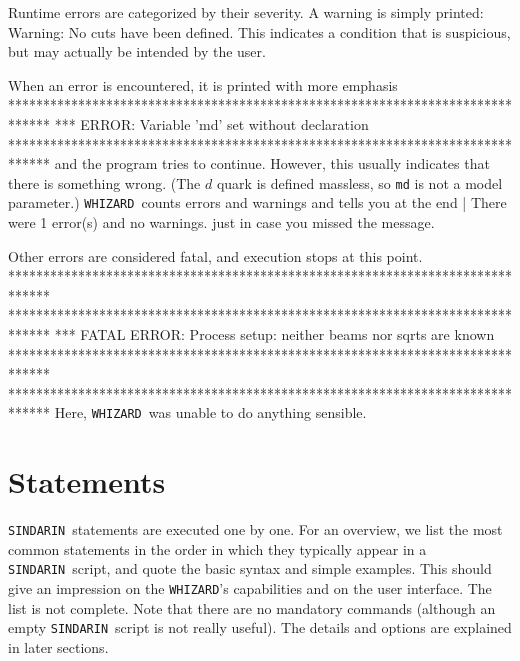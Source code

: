 \documentclass[12pt]{book}
\newenvironment{interaction}%
  {\begingroup\small
   \verbatim}%
  {\endverbatim
   \endgroup\noindent}
\newcommand{\whizard}{\texttt{WHIZARD}}
\newcommand{\sindarin}{\texttt{SINDARIN}}
\begin{document}
Runtime errors are categorized by their severity.  A warning is simply
printed:
\begin{interaction}
Warning: No cuts have been defined.
\end{interaction}
This indicates a condition that is suspicious, but may actually be
intended by the user.

When an error is encountered, it is printed with more emphasis
\begin{interaction}
******************************************************************************
*** ERROR: Variable 'md' set without declaration
******************************************************************************
\end{interaction}
and the program tries to continue.  However, this usually indicates
that there is something wrong.  (The $d$ quark is defined
massless, so \verb|md| is not a model parameter.)  \whizard\ counts
errors and warnings and tells you at the end
\begin{interaction}
| There were  1 error(s) and no warnings.
\end{interaction}
just in case you missed the message.

Other errors are considered fatal, and execution stops at this point.
\begin{interaction}
******************************************************************************
******************************************************************************
*** FATAL ERROR: Process setup: neither beams nor sqrts are known
******************************************************************************
******************************************************************************
\end{interaction}
Here, \whizard\ was unable to do anything sensible.


\section{Statements}

\sindarin\ statements are executed one by one.  For an overview, we
list the most common statements in the order in which they typically
appear in a \sindarin\ script, and quote the basic syntax and simple
examples.  This should give an impression on the \whizard's
capabilities and on the user interface.  The list is not complete.
Note that there are no
mandatory commands (although an empty \sindarin\ script is not really
useful).  The details and options are explained in later sections.
\end{document}
